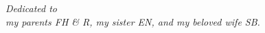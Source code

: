 \clearpage
\null\vfill
\begin{flushright}
	\textit{Dedicated to \\
		my parents FH \& R, my sister EN, and my beloved wife SB.}
\end{flushright}
\vfill
